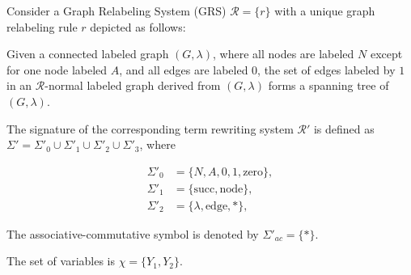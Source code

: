     \begin{example}
        \label{example_grs_to_trs}
        
        Consider a Graph Relabeling System (GRS) \(\mathcal{R} \mathop{=} \{r\}\) with a unique graph relabeling rule \(r\) depicted as follows:
    
        
        Given a connected labeled graph \((G, \lambda)\), where all nodes are labeled \(N\) except for one node labeled \(A\), and all edges are labeled \(0\), the set of edges labeled by \(1\) in an \(\mathcal{R}\)-normal labeled graph derived from \((G, \lambda)\) forms a spanning tree of \((G, \lambda)\).
        
        The signature of the corresponding term rewriting system \(\mathcal{R}'\) is defined as \(\Sigma' \mathop{=} \Sigma'_0 \mathop{\cup} \Sigma'_1 \mathop{\cup} \Sigma'_2 \mathop{\cup} \Sigma'_3\), where

        \begin{align*}
            \Sigma'_0 &= \{ N, A, 0, 1, \text{zero} \}, \\
            \Sigma'_1 &= \{ \text{succ}, \text{node} \}, \\
            \Sigma'_2 &= \{ \lambda, \text{edge}, * \},
        \end{align*}
        
        The associative-commutative symbol is denoted by \(\Sigma'_{ac} \mathop{=} \{ * \}\).
    
        The set of variables is \(\chi \mathop{=} \{ Y_1, Y_2 \}\).
        
    \end{example}    

